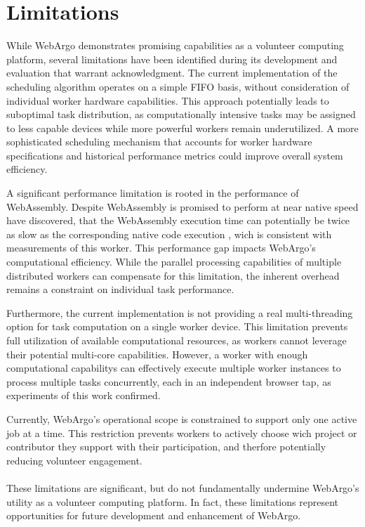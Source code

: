 \section{Limitations}
\label{sec:conclusion:limitations}
While WebArgo demonstrates promising capabilities as a volunteer computing platform, several limitations have been identified during its development and evaluation that warrant acknowledgment. The current implementation of the scheduling algorithm operates on a simple \ac{FIFO} basis, without consideration of individual worker hardware capabilities. This approach potentially leads to suboptimal task distribution, as computationally intensive tasks may be assigned to less capable devices while more powerful workers remain underutilized. A more sophisticated scheduling mechanism that accounts for worker hardware specifications and historical performance metrics could improve overall system efficiency.

A significant performance limitation is rooted in the performance of WebAssembly. Despite WebAssembly is promised to perform at near native speed \citeauthor{background:not-so-fast} have discovered, that the WebAssembly execution time can potentially be twice as slow as the corresponding native code execution \cite{background:not-so-fast}, wich is consistent with measurements of this worker. This performance gap impacts WebArgo's computational efficiency. While the parallel processing capabilities of multiple distributed workers can compensate for this limitation, the inherent overhead remains a constraint on individual task performance.

Furthermore, the current implementation is not providing a real multi-threading option for task computation on a single worker device. This limitation prevents full utilization of available computational resources, as workers cannot leverage their potential multi-core capabilities. However, a worker with enough computational capabilitys can effectively execute multiple worker instances to process multiple tasks concurrently, each in an independent browser tap, as experiments of this work confirmed.

Currently, WebArgo's operational scope is constrained to support only one active job at a time. This restriction prevents workers to actively choose wich project or contributor they support with their participation, and therfore potentially reducing volunteer engagement.
\\~\\
These limitations are significant, but do not fundamentally undermine WebArgo's utility as a volunteer computing platform. In fact, these limitations represent opportunities for future development and enhancement of WebArgo.

